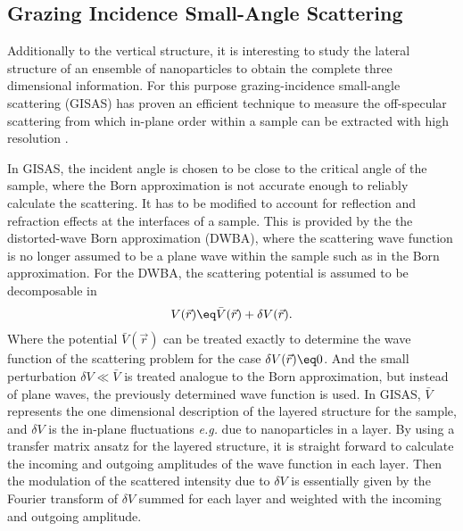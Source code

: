 \documentclass[\main/dresen_thesis.tex]{subfiles}
\begin{document}
  \subsection{Grazing Incidence Small-Angle Scattering}\label{sec:theoreticalBackground:scattering:GISAS}
    Additionally to the vertical structure, it is interesting to study the lateral structure of an ensemble of nanoparticles to obtain the complete three dimensional information.
    For this purpose grazing-incidence small-angle scattering (GISAS) has proven an efficient technique to measure the off-specular scattering from which in-plane order within a sample can be extracted with high resolution \cite{Renaud_2009_Probi}.

    In GISAS, the incident angle is chosen to be close to the critical angle of the sample, where the Born approximation is not accurate enough to reliably calculate the scattering.
    It has to be modified to account for reflection and refraction effects at the interfaces of a sample.
    This is provided by the the distorted-wave Born approximation (DWBA), where the scattering wave function is no longer assumed to be a plane wave within the sample such as in the Born approximation.
    For the DWBA, the scattering potential is assumed to be decomposable in
    \begin{align}
      V(\vec{r}) \eq \bar{V}(\vec{r}) + \delta V(\vec{r}).
    \end{align}
    Where the potential $\bar{V}(\vec{r})$ can be treated exactly to determine the wave function of the scattering problem for the case $\delta V(\vec{r})\eq 0$.
    And the small perturbation $\delta V \ll \bar{V}$ is treated analogue to the Born approximation, but instead of plane waves, the previously determined wave function is used.
    In GISAS, $\bar{V}$ represents the one dimensional description of the layered structure for the sample, and $\delta V$ is the in-plane fluctuations \textit{e.g.} due to nanoparticles in a layer.
    By using a transfer matrix ansatz for the layered structure, it is straight forward to calculate the incoming and outgoing amplitudes of the wave function in each layer.
    Then the modulation of the scattered intensity due to $\delta V$ is essentially given by the Fourier transform of $\delta V$ summed for each layer and weighted with the incoming and outgoing amplitude.
\end{document}
